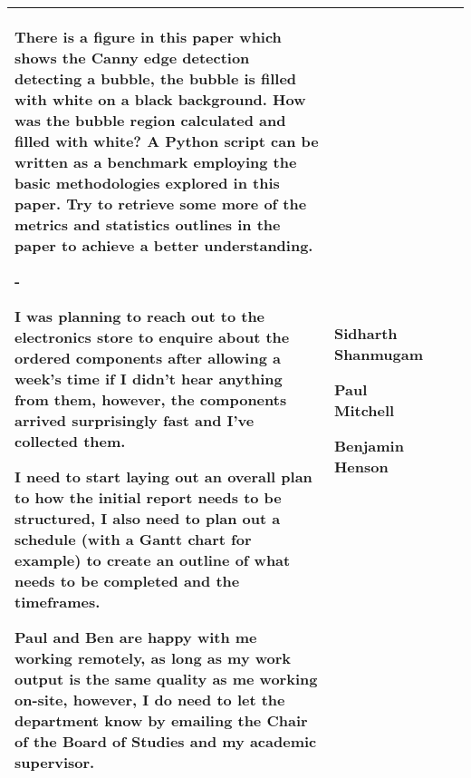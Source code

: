 \begin{table}[!h]
\begin{tabularx}{\textwidth}{|l|X|X|X|}
\begin{myitemize}
            \item There is a figure in this paper which shows the Canny edge detection detecting a bubble, the bubble is filled with white on a black background. How was the bubble region calculated and filled with white? A Python script can be written as a benchmark employing the basic methodologies explored in this paper. Try to retrieve some more of the metrics and statistics outlines in the paper to achieve a better understanding.
            \item -
            \item I was planning to reach out to the electronics store to enquire about the ordered components after allowing a week's time if I didn't hear anything from them, however, the components arrived surprisingly fast and I've collected them.
            \item I need to start laying out an overall plan to how the initial report needs to be structured, I also need to plan out a schedule (with a Gantt chart for example) to create an outline of what needs to be completed and the timeframes.
            \item Paul and Ben are happy with me working remotely, as long as my work output is the same quality as me working on-site, however, I do need to let the department know by emailing the Chair of the Board of Studies and my academic supervisor.
        \end{myitemize} &
        \begin{myitemize}
            \item Sidharth Shanmugam
            \item Paul Mitchell
            \item Benjamin Henson
        \end{myitemize} \\
        \hline
    \end{tabularx}
\end{table}
